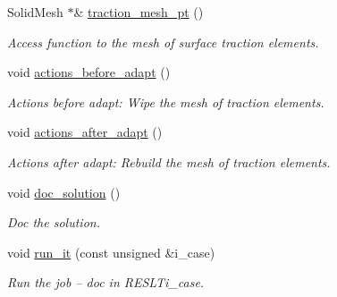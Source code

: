 \begin{DoxyCompactItemize}
Solid\+Mesh $\ast$\& \hyperlink{classCantileverProblem_af9e9b4a4686ac29bc7e4ef5d6baeae5a}{traction\+\_\+mesh\+\_\+pt} ()
\begin{DoxyCompactList}\small\item\em Access function to the mesh of surface traction elements. \end{DoxyCompactList}\item 
void \hyperlink{classCantileverProblem_a50f8964219c507562945655e0ed5fc23}{actions\+\_\+before\+\_\+adapt} ()
\begin{DoxyCompactList}\small\item\em Actions before adapt\+: Wipe the mesh of traction elements. \end{DoxyCompactList}\item 
void \hyperlink{classCantileverProblem_af4d135ace3eac657b38de362e1644c75}{actions\+\_\+after\+\_\+adapt} ()
\begin{DoxyCompactList}\small\item\em Actions after adapt\+: Rebuild the mesh of traction elements. \end{DoxyCompactList}\item 
void \hyperlink{classCantileverProblem_a7571348f8724e71be4e67dc64cea3877}{doc\+\_\+solution} ()
\begin{DoxyCompactList}\small\item\em Doc the solution. \end{DoxyCompactList}\item 
void \hyperlink{classCantileverProblem_a5c78c6602e0cbeac68239804c2d52243}{run\+\_\+it} (const unsigned \&i\+\_\+case)
\begin{DoxyCompactList}\small\item\em Run the job -- doc in R\+E\+S\+L\+Ti\+\_\+case. \end{DoxyCompactList}\end{DoxyCompactItemize}
